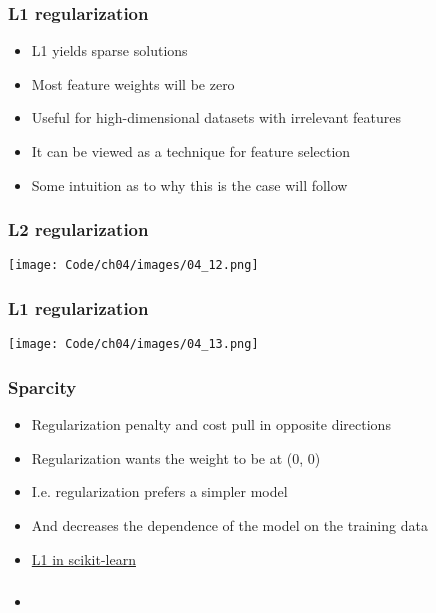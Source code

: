 \documentclass{beamer}
\begin{document}
\begin{frame}
  \frametitle{L1 regularization}
  \begin{itemize}
  \item L1 yields sparse solutions
  \item Most feature weights will be zero
  \item Useful for high-dimensional datasets with irrelevant features
  \item It can be viewed as a technique for feature selection
  \item Some intuition as to why this is the case will follow
  \end{itemize}
\end{frame}

\begin{frame}
  \frametitle{L2 regularization}
  \texttt{[image: Code/ch04/images/04\_12.png]} 
\end{frame}

\begin{frame}
  \frametitle{L1 regularization}
  \texttt{[image: Code/ch04/images/04\_13.png]} 
\end{frame}

\begin{frame}
  \frametitle{Sparcity}
  \begin{itemize}
  \item Regularization penalty and cost pull in opposite directions
  \item Regularization wants the weight to be at (0, 0)
  \item I.e. regularization prefers a simpler model
  \item And decreases the dependence of the model on the training data
  \item \href{https://github.com/rasbt/python-machine-learning-book/tree/master/code/ch04}{L1 in scikit-learn}
  \end{itemize}
\end{frame}

\begin{frame}
  \frametitle{}
  \begin{itemize}
  \item 
  \end{itemize}
\end{frame}
\end{document}
